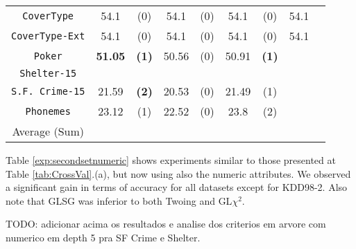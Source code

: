 \begin{table*}
\begin{tabular}{c|cc|cc|cc|cc}
{\tt CoverType}    &54.1        & (0)       & 54.1        & (0)       & 54.1        & (0)       & 54.1        &           \\
{\tt CoverType-Ext}&54.1        & (0)       & 54.1        & (0)       & 54.1        & (0)       & 54.1        &           \\
{\tt Poker}        &{\bf 51.05} & {\bf (1)} & 50.56       & (0)       & 50.91       & {\bf (1)} &             &           \\  
{\tt Shelter-15}   &            &           &             &           &             &           &             &           \\   
{\tt S.F. Crime-15}& 21.59      & {\bf (2)} & 20.53       & (0)       & 21.49       & (1)       &             &           \\ 
{\tt Phonemes}     & 23.12      & (1)       & 22.52       & (0)       & 23.8        & (2)       &             &           \\ 
\hline
Average (Sum)      &            &           &             &           &             &           &             & 
       \end{tabular}
\end{table*}


Table \ref{exp:secondsetnumeric} shows experiments  similar to those presented at Table \ref{tab:CrossVal}.(a), but now
using also the numeric attributes. We observed a significant gain in terms of accuracy for all datasets except for KDD98-2. 
Also note that GLSG was inferior to both Twoing and GL$\chi^2$.

TODO: adicionar acima os resultados e analise dos criterios em arvore com numerico em depth 5 pra SF Crime e Shelter.

